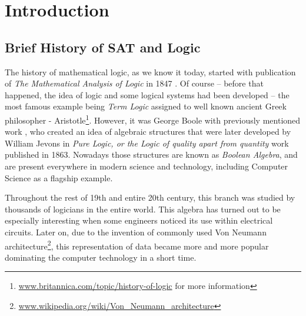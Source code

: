 \documentclass[12pt,english,pdflatex]{aghdpl}
\begin{document}
\sffamily  %
\author{Sebastian Morawiec}
\titlepages
\setcounter{tocdepth}{2}

\tableofcontents{}

\chapter{Introduction}
\label{chap:Wstep}

\section{Brief History of SAT and Logic}
\label{sec:intro_SAT}

The history of mathematical logic, as we know it today, started with
publication of \textit{The Mathematical Analysis of Logic} in 1847 \cite{boole1847mathematical} .
Of course -- before that happened, the idea of logic and some logical systems had been
developed -- the most famous example being \textit{Term Logic} assigned to well
known ancient Greek philosopher - Aristotle\footnote{\url{www.britannica.com/topic/history-of-logic} for more information}.
However, it was George
Boole with previously mentioned work \cite{boole1847mathematical}, who created an idea of algebraic
structures that were later developed by William Jevons in \textit{Pure
Logic, or the Logic of quality apart from quantity} \cite{jevons2015pure} work published
in 1863. Nowadays those structures are known as \textit{Boolean Algebra}, and
are present everywhere in modern science and technology, including Computer Science as a flagship example. 

Throughout the rest of 19th
and entire 20th century, this branch was studied by thousands of logicians
in the entire world. This algebra has turned out to be especially interesting
when some engineers noticed its use within electrical circuits. Later
on, due to the invention of commonly used Von Neumann architecture\footnote{\url{www.wikipedia.org/wiki/Von\_Neumann\_architecture}},
this representation of data became more and more popular dominating the computer technology in a short time.
\end{document}
